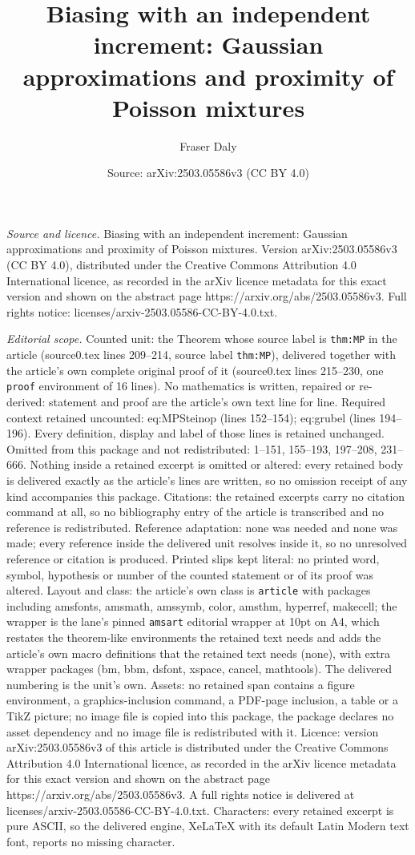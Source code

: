 \documentclass[10pt,a4paper]{amsart}
\title[Biasing with an independent increment: Gaussian approximatio]{Biasing with an independent increment: Gaussian approximations and proximity of Poisson mixtures}
\author{Fraser Daly}
\date{Source: arXiv:2503.05586v3 (CC BY 4.0)}
\begin{document}
\maketitle

\noindent\emph{Source and licence.} Biasing with an independent increment: Gaussian approximations and proximity of Poisson mixtures. Version arXiv:2503.05586v3 (CC BY 4.0), distributed under the Creative Commons Attribution 4.0 International licence, as recorded in the arXiv licence metadata for this exact version and shown on the abstract page https://arxiv.org/abs/2503.05586v3. Full rights notice: licenses/arxiv-2503.05586-CC-BY-4.0.txt.\par\smallskip

\noindent\textit{Editorial scope.} Counted unit: the Theorem whose source label is \texttt{thm:MP} in the article (source0.tex lines 209--214, source label \texttt{thm:MP}), delivered together with the article's own complete original proof of it (source0.tex lines 215--230, one \texttt{proof} environment of 16 lines). No mathematics is written, repaired or re-derived: statement and proof are the article's own text line for line. Required context retained uncounted: eq:MPSteinop (lines 152--154); eq:grubel (lines 194--196). Every definition, display and label of those lines is retained unchanged. Omitted from this package and not redistributed: 1--151, 155--193, 197--208, 231--666. Nothing inside a retained excerpt is omitted or altered: every retained body is delivered exactly as the article's lines are written, so no omission receipt of any kind accompanies this package. Citations: the retained excerpts carry no citation command at all, so no bibliography entry of the article is transcribed and no reference is redistributed. Reference adaptation: none was needed and none was made; every reference inside the delivered unit resolves inside it, so no unresolved reference or citation is produced. Printed slips kept literal: no printed word, symbol, hypothesis or number of the counted statement or of its proof was altered. Layout and class: the article's own class is \texttt{article} with packages including amsfonts, amsmath, amssymb, color, amsthm, hyperref, makecell; the wrapper is the lane's pinned \texttt{amsart} editorial wrapper at 10pt on A4, which restates the theorem-like environments the retained text needs and adds the article's own macro definitions that the retained text needs (none), with extra wrapper packages (bm, bbm, dsfont, xspace, cancel, mathtools). The delivered numbering is the unit's own. Assets: no retained span contains a figure environment, a graphics-inclusion command, a PDF-page inclusion, a table or a TikZ picture; no image file is copied into this package, the package declares no asset dependency and no image file is redistributed with it. Licence: version arXiv:2503.05586v3 of this article is distributed under the Creative Commons Attribution 4.0 International licence, as recorded in the arXiv licence metadata for this exact version and shown on the abstract page https://arxiv.org/abs/2503.05586v3. A full rights notice is delivered at licenses/arxiv-2503.05586-CC-BY-4.0.txt. Characters: every retained excerpt is pure ASCII, so the delivered engine, XeLaTeX with its default Latin Modern text font, reports no missing character.
\end{document}
